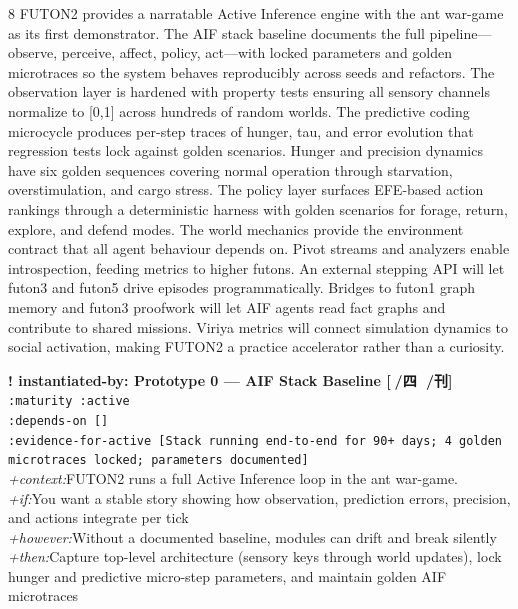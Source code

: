 \documentclass[landscape]{article}
\newcommand{\flexitag}[1]{\textcolor[gray]{0.35}{\textit{#1}}}
\newenvironment{devmapactive}{%
  \def\FrameCommand{\colorbox{devmapactivebg}}%
  \setlength{\fboxsep}{2pt}%
  \MakeFramed{\advance\hsize-\width \FrameRestore}%
}{\endMakeFramed}
\begin{document}
\begin{paracol}{8}
FUTON2 provides a narratable Active Inference engine with the ant war-game as its first demonstrator. The AIF stack baseline documents the full pipeline—observe, perceive, affect, policy, act—with locked parameters and golden microtraces so the system behaves reproducibly across seeds and refactors. The observation layer is hardened with property tests ensuring all sensory channels normalize to [0,1] across hundreds of random worlds. The predictive coding microcycle produces per-step traces of hunger, tau, and error evolution that regression tests lock against golden scenarios. Hunger and precision dynamics have six golden sequences covering normal operation through starvation, overstimulation, and cargo stress. The policy layer surfaces EFE-based action rankings through a deterministic harness with golden scenarios for forage, return, explore, and defend modes. The world mechanics provide the environment contract that all agent behaviour depends on. Pivot streams and analyzers enable introspection, feeding metrics to higher futons. An external stepping API will let futon3 and futon5 drive episodes programmatically. Bridges to futon1 graph memory and futon3 proofwork will let AIF agents read fact graphs and contribute to shared missions. Viriya metrics will connect simulation dynamics to social activation, making FUTON2 a practice accelerator rather than a curiosity.\\
\par
\par
\begin{devmapactive}
\textbf{! instantiated-by: Prototype 0 — AIF Stack Baseline [🌝/四 🗿/刊]}\\
  \texttt{:\allowbreak{}maturity :\allowbreak{}active}\\
  \texttt{:\allowbreak{}depends-\allowbreak{}on []}\\
  \texttt{:\allowbreak{}evidence-\allowbreak{}for-\allowbreak{}active [Stack running end-\allowbreak{}to-\allowbreak{}end for 90+\allowbreak{} days;\allowbreak{} 4 golden microtraces locked;\allowbreak{} parameters documented]}\\
  \flexitag{+context:}FUTON2 runs a full Active Inference loop in the ant war-game.\\
  \flexitag{+if:}You want a stable story showing how observation, prediction errors, precision, and actions integrate per tick\\
  \flexitag{+however:}Without a documented baseline, modules can drift and break silently\\
  \flexitag{+then:}Capture top-level architecture (sensory keys through world updates), lock hunger and predictive micro-step parameters, and maintain golden AIF microtraces\\

\end{devmapactive}
\end{paracol}
\end{document}

